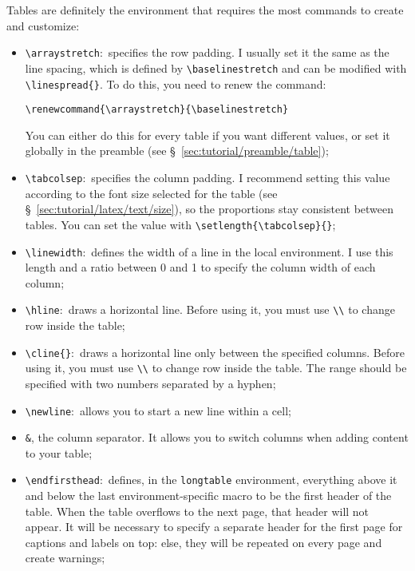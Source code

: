 \noindent Tables are definitely the \gls{environment} that requires the most \glspl{command} to create and customize:
\begin{itemize}
    \item \texttt{\textbackslash{}arraystretch}:~specifies the row padding. I usually set it the same as the line spacing, which is defined by \texttt{\textbackslash{}baselinestretch} and can be modified with \texttt{\textbackslash{}linespread\{\}}. To do this, you need to renew the \gls{command}:
    \begin{center}
        \verb"\renewcommand{\arraystretch}{\baselinestretch}"
    \end{center}
    You can either do this for every table if you want different \glspl{value}, or set it globally in the preamble (see \S~\ref{sec:tutorial/preamble/table});
    \item \texttt{\textbackslash{}tabcolsep}:~specifies the column padding. I recommend setting this \gls{value} according to the font size selected for the table (see \S~\ref{sec:tutorial/latex/text/size}), so the proportions stay consistent between tables. You can set the \gls{value} with \texttt{\textbackslash{}setlength\{\textbackslash{}tabcolsep\}\{\}};
    \item \texttt{\textbackslash{}linewidth}:~defines the width of a line in the local \gls{environment}. I use this length and a ratio between 0 and 1 to specify the column width of each column;
    \item \texttt{\textbackslash{}hline}:~draws a horizontal line. Before using it, you must use \texttt{\textbackslash\textbackslash} to change row inside the table;
    \item \texttt{\textbackslash{}cline\{\}}:~draws a horizontal line only between the specified columns. Before using it, you must use \texttt{\textbackslash\textbackslash} to change row inside the table. The range should be specified with two numbers separated by a hyphen;
    \item \texttt{\textbackslash{}newline}:~allows you to start a new line within a cell;
    \item {\large \texttt{\&}}, the column separator. It allows you to switch columns when adding content to your table;
    \item \texttt{\textbackslash{}endfirsthead}:~defines, in the \texttt{longtable} \gls{environment}, everything above it and below the last \gls{environment}-specific \gls{macro} to be the first header of the table. When the table overflows to the next page, that header will not appear. It will be necessary to specify a separate header for the first page for captions and \glspl{label} on top: else, they will be repeated on every page and create warnings;

\end{itemize}
